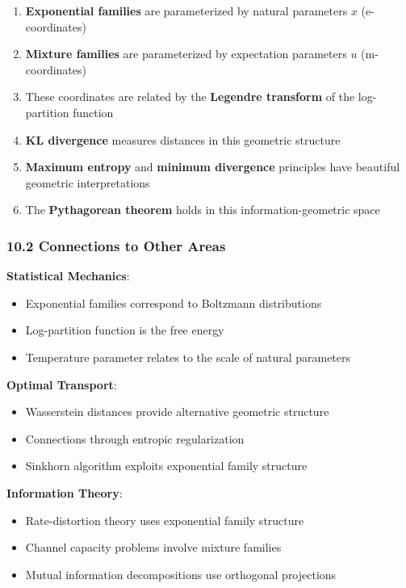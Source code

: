 \documentclass{amsart}
\theoremstyle{plain}
\theoremstyle{definition}
\theoremstyle{remark}
\begin{document}
\begin{enumerate}
	\item \textbf{Exponential families} are parameterized by natural parameters $x$ (e-coordinates)
	\item \textbf{Mixture families} are parameterized by expectation parameters $u$ (m-coordinates)
	\item These coordinates are related by the \textbf{Legendre transform} of the log-partition function
	\item \textbf{KL divergence} measures distances in this geometric structure
	\item \textbf{Maximum entropy} and \textbf{minimum divergence} principles have beautiful geometric interpretations
	\item The \textbf{Pythagorean theorem} holds in this information-geometric space
\end{enumerate}

\subsubsection{10.2 Connections to Other Areas}

\textbf{Statistical Mechanics}:

\begin{itemize}
	\item Exponential families correspond to Boltzmann distributions
	\item Log-partition function is the free energy
	\item Temperature parameter relates to the scale of natural parameters
\end{itemize}

\textbf{Optimal Transport}:

\begin{itemize}
	\item Wasserstein distances provide alternative geometric structure
	\item Connections through entropic regularization
	\item Sinkhorn algorithm exploits exponential family structure
\end{itemize}

\textbf{Information Theory}:

\begin{itemize}
	\item Rate-distortion theory uses exponential family structure
	\item Channel capacity problems involve mixture families
	\item Mutual information decompositions use orthogonal projections
\end{itemize}
\end{document}
